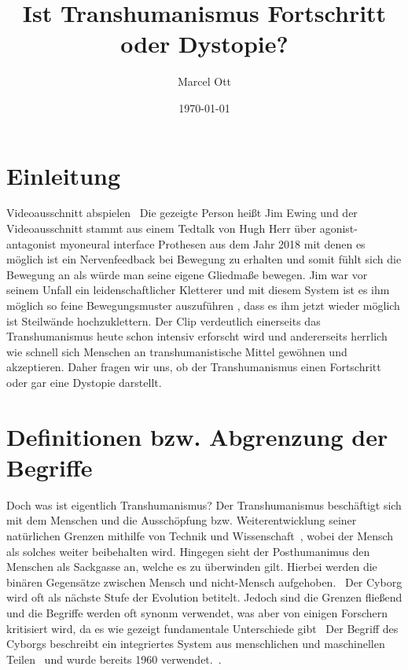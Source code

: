 \documentclass[a4paper,
DIV=13,
12pt,
BCOR=10mm,
department=FakEI,
twoside,
parskip=half,
automark,
]{OTHRartcl}
\date{\today}
\title{Ist Transhumanismus Fortschritt oder Dystopie?}
\author{Marcel Ott}
\begin{document}
\maketitle

\section*{Einleitung}
Videoausschnitt abspielen~\cite{HughHerrYoutube} Die gezeigte Person heißt Jim Ewing und der Videoausschnitt stammt aus einem Tedtalk von Hugh Herr über agonist-antagonist myoneural interface Prothesen aus dem Jahr 2018 mit denen
es möglich ist ein Nervenfeedback bei Bewegung zu erhalten und somit fühlt sich die Bewegung an als würde man seine eigene Gliedmaße bewegen. Jim war vor seinem Unfall ein leidenschaftlicher Kletterer und mit diesem System
ist es ihm möglich so feine Bewegungsmuster auszuführen , dass es ihm jetzt wieder möglich ist Steilwände hochzuklettern.%
Der Clip verdeutlich einerseits das Transhumanismus heute schon intensiv erforscht wird und andererseits herrlich wie schnell sich Menschen an transhumanistische Mittel gewöhnen und akzeptieren. Daher fragen wir uns,
ob der Transhumanismus einen Fortschritt oder gar eine Dystopie darstellt.

\section*{Definitionen bzw. Abgrenzung der Begriffe}
Doch was ist eigentlich Transhumanismus?
Der Transhumanismus beschäftigt sich mit dem Menschen und die Ausschöpfung bzw. Weiterentwicklung seiner natürlichen Grenzen mithilfe von Technik und Wissenschaft~\cite{Merzlyakov2022},
wobei der Mensch als solches weiter beibehalten wird. Hingegen sieht der Posthumanimus den Menschen als Sackgasse an, welche es zu überwinden gilt. Hierbei werden die binären Gegensätze
zwischen Mensch und nicht-Mensch aufgehoben.~\cite{Merzlyakov2022} Der Cyborg wird oft als nächste Stufe der Evolution betitelt. Jedoch sind die Grenzen fließend und die Begriffe werden
oft synonm verwendet, was aber von einigen Forschern kritisiert wird, da es wie gezeigt fundamentale Unterschiede gibt~\cite{Merzlyakov2022} Der Begriff des Cyborgs beschreibt ein
integriertes System aus menschlichen und maschinellen Teilen~\cite{warwick2000cyborg} und wurde bereits 1960 verwendet.~\cite{clynes1960cyborgs}.
\end{document}
